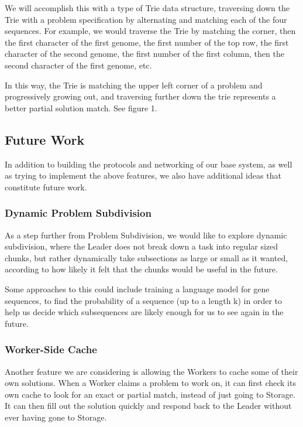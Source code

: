 \documentclass[11pt]{article}
\begin{document}
We will accomplish this with a type of Trie data structure, traversing down the Trie with a problem specification by alternating and matching each of the four sequences. For example, we would traverse the Trie by matching the corner, then the first character of the first genome, the first number of the top row, the first character of the second genome, the first number of the first column, then the second character of the first genome, etc. 

In this way, the Trie is matching the upper left corner of a problem and progressively growing out, and traversing further down the trie represents a better partial solution match. See figure 1.




\subsection{Future Work}
In addition to building the protocols and networking of our base system, as well as trying to implement the above features, we also have additional ideas that constitute future work.

\subsubsection{Dynamic Problem Subdivision}
As a step further from Problem Subdivision, we would like to explore dynamic subdivision, where the Leader does not break down a task into regular sized chunks, but rather dynamically take subsections as large or small as it wanted, according to how likely it felt that the chunks would be useful in the future.

Some approaches to this could include training a language model for gene sequences, to find the probability of a sequence (up to a length k) in order to help us decide which subsequences are likely enough for us to see again in the future.




\subsubsection{Worker-Side Cache}

Another feature we are considering is allowing the Workers to cache some of their own solutions. When a Worker claims a problem to work on, it can first check its own cache to look for an exact or partial match, instead of just going to Storage. It can then fill out the solution quickly and respond back to the Leader without ever having gone to Storage. 
\end{document}
